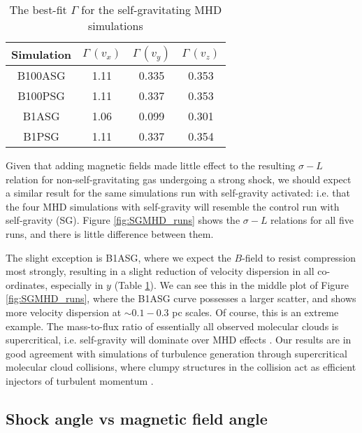 \documentclass[a4paper,fleqn,usenatbib]{mnras}
\begin{document}
\begin{table}
\centering
  \caption{The best-fit $\Gamma$ for the self-gravitating MHD simulations \label{tab:SGMHD_fits}}
  \begin{tabular}{c | ccc}
  \hline
  \hline
   Simulation  &  $\Gamma \,(v_x)$ & $\Gamma \,(v_y)$& $\Gamma \,(v_z)$ \\
   \hline
   B100ASG & 1.11 & 0.335 & 0.353 \\
   B100PSG  & 1.11 & 0.337 & 0.353 \\
   B1ASG & 1.06 & 0.099 & 0.301 \\
   B1PSG & 1.11 & 0.337 & 0.354 \\
 \hline
  \hline
\end{tabular}
\end{table}

\noindent Given that adding magnetic fields made little effect to the resulting $\sigma-L$ relation for non-self-gravitating gas undergoing a strong shock, we should expect a similar result for the same simulations run with self-gravity activated: i.e. that the four MHD simulations with self-gravity will resemble the control run with self-gravity (SG).  Figure \ref{fig:SGMHD_runs} shows the $\sigma-L$ relations for all five runs, and there is little difference between them.  

The slight exception is B1ASG, where we expect the $B$-field to resist compression most strongly, resulting in a slight reduction of velocity dispersion in all co-ordinates, especially in $y$ (Table \ref{tab:SGMHD_fits}).  We can see this in the middle plot of Figure \ref{fig:SGMHD_runs}, where the B1ASG curve possesses a larger scatter, and shows more velocity dispersion at $\sim 0.1-0.3$ pc scales.  Of course, this is an extreme example.  The mass-to-flux ratio of essentially all observed molecular clouds is supercritical, i.e. self-gravity will dominate over MHD effects \citep{Crutcher2012}.  Our results are in good agreement with simulations of turbulence generation through supercritical molecular cloud collisions, where clumpy structures in the collision act as efficient injectors of turbulent momentum  \citep{Wu2018}.


\subsection{Shock angle vs magnetic field angle}
\end{document}
